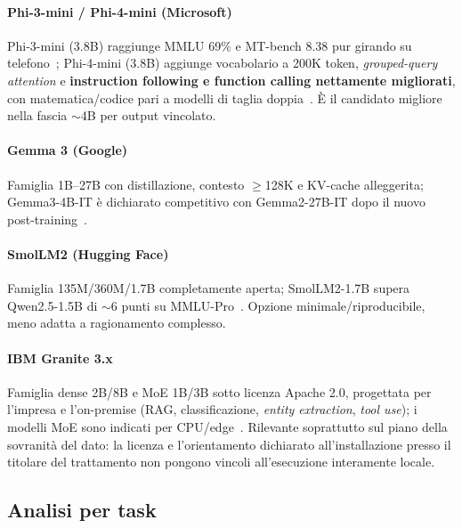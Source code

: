 \paragraph*{Phi-3-mini / Phi-4-mini (Microsoft)} Phi-3-mini (3.8B) raggiunge MMLU 69\% e MT-bench 8.38 pur girando su telefono~\cite{abdin2024phi3}; Phi-4-mini (3.8B) aggiunge vocabolario a 200K token, \textit{grouped-query attention} e \textbf{instruction following e function calling nettamente migliorati}, con matematica/codice pari a modelli di taglia doppia~\cite{abouelenin2025phi4mini, abdin2024phi3}. È il candidato migliore nella fascia $\sim$4B per output vincolato.

\paragraph*{Gemma 3 (Google)} Famiglia 1B--27B con distillazione, contesto $\geq$128K e KV-cache alleggerita; Gemma3-4B-IT è dichiarato competitivo con Gemma2-27B-IT dopo il nuovo post-training~\cite{gemma2025gemma3}.

\paragraph*{SmolLM2 (Hugging Face)} Famiglia 135M/360M/1.7B completamente aperta; SmolLM2-1.7B supera Qwen2.5-1.5B di $\sim$6 punti su MMLU-Pro~\cite{benallal2025smollm2}. Opzione minimale/riproducibile, meno adatta a ragionamento complesso.

\paragraph*{IBM Granite 3.x} Famiglia dense 2B/8B e MoE 1B/3B sotto licenza Apache 2.0, progettata per l'impresa e l'on-premise (RAG, classificazione, \textit{entity extraction}, \textit{tool use}); i modelli MoE sono indicati per CPU/edge~\cite{granite2024granite30}. Rilevante soprattutto sul piano della sovranità del dato: la licenza e l'orientamento dichiarato all'installazione presso il titolare del trattamento non pongono vincoli all'esecuzione interamente locale.

\subsection{Analisi per task}
\label{sub:slm-task}

